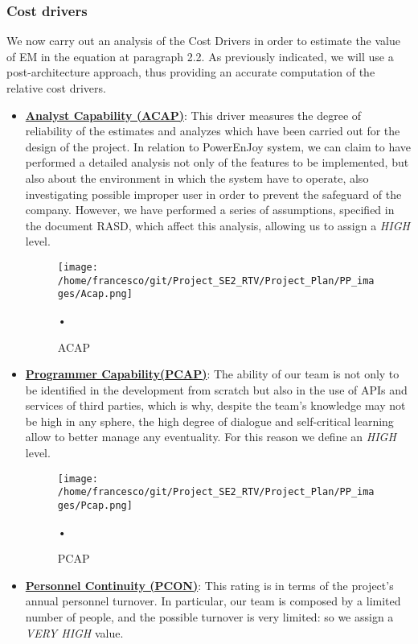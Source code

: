 \documentclass[10pt, a4paper,titlepage]{article}
\begin{document}
\subsubsection{Cost drivers}
We now carry out an analysis of the Cost Drivers in order to estimate the value of EM in the equation at paragraph 2.2.
As previously indicated, we will use a post-architecture approach, thus providing an accurate computation of the relative cost drivers.
\begin{itemize}
\item \underline{\textbf{Analyst Capability (ACAP)}}: This driver measures the degree of reliability of the estimates and analyzes which have been carried out for the design of the project. In relation to PowerEnJoy system, we can claim to have performed a detailed analysis not only of the features to be implemented, but also about the environment in which the system have to operate, also investigating possible improper user in order to prevent the safeguard of the company. However, we have performed a series of assumptions, specified in the document RASD, which affect this analysis, allowing us to assign a \emph{HIGH} level.
\begin{figure}[h]
\begin{center}
\texttt{[image: /home/francesco/git/Project\_SE2\_RTV/Project\_Plan/PP\_images/Acap.png]}
\caption{ACAP}
\label{fig:ACAP}
\end{center}•
\end{figure}
\pagebreak
\item \underline{\textbf{Programmer Capability(PCAP)}}: The ability of our team is not only to be identified in the development from scratch but also in the use of APIs and services of third parties, which is why, despite the team's knowledge may not be high in any sphere, the high degree of dialogue and self-critical learning allow to better manage any eventuality. For this reason we define an \emph{HIGH} level.
\begin{figure}[h]
\begin{center}
\texttt{[image: /home/francesco/git/Project\_SE2\_RTV/Project\_Plan/PP\_images/Pcap.png]}
\caption{PCAP}
\label{fig:PCAP}
\end{center}•
\end{figure}
\linebreak
\item \underline{\textbf{Personnel Continuity (PCON)}}: This rating is in terms of the project’s annual personnel turnover. In particular, our team is composed by a limited number of people, and the possible turnover is very limited: so we assign a \emph{VERY HIGH} value.

\end{itemize}
\end{document}
